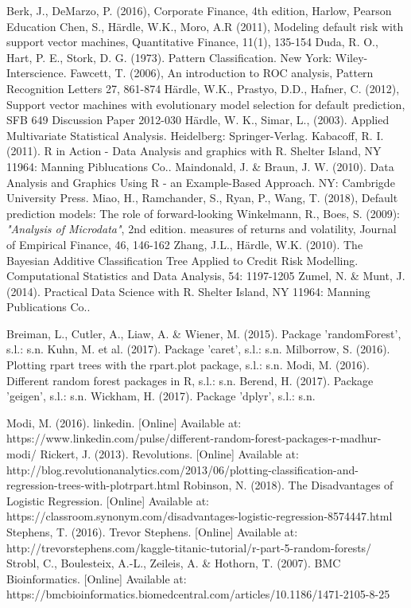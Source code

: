 \documentclass{article}
\begin{document}
\begin{thebibliography}{9}
  Berk, J., DeMarzo, P. (2016), Corporate Finance, 4th edition, Harlow, Pearson Education 
  Chen, S., H{\"a}rdle, W.K., Moro, A.R (2011), Modeling default risk with support vector machines,  Quantitative Finance, 11(1), 135-154
Duda, R. O., Hart, P. E., Stork, D. G. (1973). Pattern Classification. New York: Wiley-Interscience.
  Fawcett, T. (2006), An introduction to ROC analysis, Pattern Recognition Letters 27, 861-874
  H{\"a}rdle, W.K., Prastyo, D.D., Hafner, C. (2012), Support vector machines with evolutionary model selection for default prediction, SFB 649 Discussion Paper 2012-030
H{\"a}rdle, W. K., Simar, L., (2003). Applied Multivariate Statistical Analysis. Heidelberg: Springer-Verlag.
Kabacoff, R. I. (2011). R in Action - Data Analysis and graphics with R. Shelter Island, NY 11964: Manning Piblucations Co..
Maindonald, J. \& Braun, J. W. (2010). Data Analysis and Graphics Using R - an Example-Based Approach. NY: Cambrigde University Press.
  Miao, H., Ramchander, S., Ryan, P., Wang, T. (2018), Default prediction models: The role of forward-looking 
  Winkelmann, R., Boes, S. (2009): \textit{"Analysis of Microdata"}, 2nd edition.
measures of returns and volatility, Journal of Empirical Finance, 46, 146-162
  Zhang, J.L., H{\"a}rdle, W.K. (2010). The Bayesian Additive Classification Tree Applied to Credit Risk Modelling. Computational Statistics and Data Analysis, 54: 1197-1205 
Zumel, N. \& Munt, J. (2014). Practical Data Science with R. Shelter Island, NY 11964: Manning Publications Co..

Breiman, L., Cutler, A., Liaw, A. \& Wiener, M. (2015). Package 'randomForest', s.l.: s.n.
Kuhn, M. et al. (2017). Package 'caret', s.l.: s.n.
Milborrow, S. (2016). Plotting rpart trees with the rpart.plot package, s.l.: s.n.
Modi, M. (2016). Different random forest packages in R, s.l.: s.n.
Berend, H. (2017). Package 'geigen', s.l.: s.n.
Wickham, H. (2017). Package 'dplyr', s.l.: s.n.

Modi, M. (2016). linkedin. [Online] 
Available at: https://www.linkedin.com/pulse/different-random-forest-packages-r-madhur-modi/
Rickert, J. (2013). Revolutions. [Online] 
Available at: http://blog.revolutionanalytics.com/2013/06/plotting-classification-and-regression-trees-with-plotrpart.html
Robinson, N. (2018). The Disadvantages of Logistic Regression. [Online] 
Available at: https://classroom.synonym.com/disadvantages-logistic-regression-8574447.html
Stephens, T. (2016). Trevor Stephens. [Online] 
Available at: http://trevorstephens.com/kaggle-titanic-tutorial/r-part-5-random-forests/
Strobl, C., Boulesteix, A.-L., Zeileis, A. \& Hothorn, T. (2007). BMC Bioinformatics. [Online] 
Available at: https://bmcbioinformatics.biomedcentral.com/articles/10.1186/1471-2105-8-25


\end{thebibliography}
\end{document}
